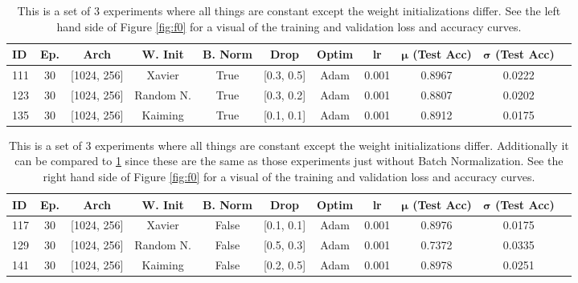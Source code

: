 \documentclass[11pt]{amsart}
\begin{document}
\begin{table}[h]
    \centering
    \begin{tabular}{|l|c|c|c|c|c|c|c|c|c|c|} %
        \hline
        \textbf{ID} & \textbf{Ep.}
        & \textbf{Arch} & \textbf{W. Init}
        & \textbf{B. Norm} & \textbf{Drop}
        & \textbf{Optim} & \textbf{lr}
	& \textbf{$\bm \mu$ (Test Acc)}
        & \textbf{$\bm \sigma$ (Test Acc)} \\ 
        \hline
        111 & 30 & [1024, 256]  & Xavier 		& True & [0.3, 0.5] & Adam & 0.001 & 0.8967 & 0.0222 \\
        \hline
        123 & 30 & [1024, 256]  & Random N. 	& True & [0.3, 0.2] & Adam & 0.001 & 0.8807 & 0.0202 \\
        \hline
        135 & 30 & [1024, 256]  & Kaiming 		& True & [0.1, 0.1] & Adam & 0.001 & 0.8912 & 0.0175 \\  
        \hline
    \end{tabular}
    \caption{This is a set of 3 experiments where all things are constant except the weight initializations differ.
    See the left hand side of Figure \ref{fig:f0} for a visual of the training and validation loss and accuracy curves.}
    \label{tab:tab0}
\end{table}

\begin{table}[h]
    \centering
    \begin{tabular}{|l|c|c|c|c|c|c|c|c|c|c|} %
        \hline
        \textbf{ID} & \textbf{Ep.}
        & \textbf{Arch} & \textbf{W. Init}
        & \textbf{B. Norm} & \textbf{Drop}
        & \textbf{Optim} & \textbf{lr}
	& \textbf{$\bm \mu$ (Test Acc)}
        & \textbf{$\bm \sigma$ (Test Acc)} \\ 
        \hline
        117 & 30 & [1024, 256]  & Xavier 		& False & [0.1, 0.1] & Adam & 0.001 & 0.8976 & 0.0175 \\
        \hline
        129 & 30 & [1024, 256]  & Random N. 	& False & [0.5, 0.3] & Adam & 0.001 & 0.7372 & 0.0335 \\
        \hline
        141 & 30 & [1024, 256]  & Kaiming 		& False & [0.2, 0.5] & Adam & 0.001 & 0.8978 & 0.0251 \\  
        \hline
    \end{tabular}
    \caption{This is a set of 3 experiments where all things are constant except the weight initializations differ.
    Additionally it can be compared to \ref{tab:tab0} since these are the same as those experiments just without Batch Normalization.
    See the right hand side of Figure \ref{fig:f0} for a visual of the training and validation loss and accuracy curves.}
    \label{tab:tab1}
\end{table}
\end{document}
